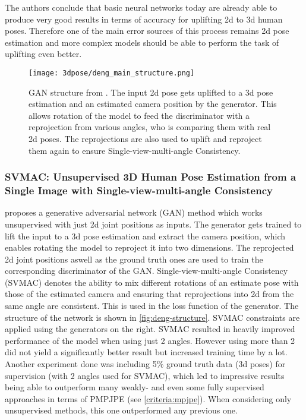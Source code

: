  The authors conclude that basic neural networks today are already able to produce very good results in terms of accuracy for uplifting 2d to 3d human poses. Therefore one of the main error sources of this process remains 2d pose estimation and more complex models should be able to perform the task of uplifting even better.
 
\begin{figure*}[!htb]
 	\centering
 	\texttt{[image: 3dpose/deng\_main\_structure.png]}
 	\caption{GAN structure from \cite{Deng2021}. The input 2d pose gets uplifted to a 3d pose estimation and an estimated camera position by the generator. This allows rotation of the model to feed the discriminator with a reprojection from various angles, who is comparing them with real 2d poses. The reprojections are also used to uplift and reproject them again to ensure Single-view-multi-angle Consistency.}
 	\label{fig:deng-structure}
\end{figure*}
 
\subsubsection{SVMAC: Unsupervised 3D Human Pose Estimation from a Single Image with Single-view-multi-angle Consistency}
\cite{Deng2021} proposes a generative adversarial network (GAN) method which works unsupervised with just 2d joint positions as inputs. The generator gets trained to lift the input to a 3d pose estimation and extract the camera position, which enables rotating the model to reproject it into two dimensions. The reprojected 2d joint positions aswell as the ground truth ones are used to train the corresponding discriminator of the GAN. Single-view-multi-angle Consistency (SVMAC) denotes the ability to mix different rotations of an estimate pose with those of the estimated camera and ensuring that reprojections into 2d from the same angle are consistent. This is used in the loss function of the generator.
The structure of the network is shown in \autoref{fig:deng-structure}. SVMAC constraints are applied using the generators on the right.
SVMAC resulted in heavily improved performance of the model when using just 2 angles. However using more than 2 did not yield a significantly better result but increased training time by a lot.
Another experiment done was including 5\% ground truth data (3d poses) for supervision (with 2 angles used for SVMAC), which led to impressive results being able to outperform many weakly- and even some fully supervised approaches in terms of PMPJPE (see \autoref{criteria:mpjpe}). When considering only unsupervised methods, this one outperformed any previous one.
 
